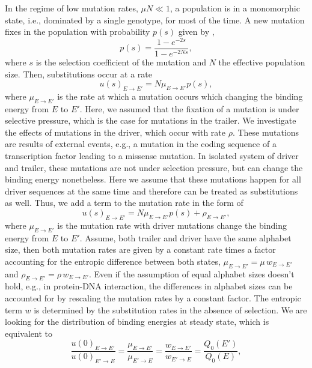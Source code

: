 \documentclass[10pt,a4paper]{article}
\begin{document}
\noindent In the regime of low mutation rates, $\mu N\ll1$, a population is in a monomorphic state, i.e., dominated by a single genotype, 
for most of the time. A new mutation fixes in the population with probability $p(s)$ given by \cite{kimura_probability_1962},
\begin{equation}
p(s) = \frac{1-e^{-2s}}{1-e^{-2Ns}},
\end{equation}
where $s$ is the selection coefficient of the mutation and $N$ the effective population size. Then, substitutions occur at a rate
\begin{equation}
u(s)_{E\rightarrow E'} = N\mu_{E\rightarrow E'}p(s),
\end{equation}
where $\mu_{E\rightarrow E'}$ is the rate at which a mutation occurs which changing the binding energy from $E$ to $E'$. Here, we assumed that the fixation 
of a mutation is under selective pressure, which is the case for mutations in the trailer. We investigate the effects of mutations in the driver, which occur 
with rate $\rho$. These mutations are results of external events, e.g., a mutation in the coding sequence of a transcription factor leading to a missense mutation. 
In isolated system of driver and trailer, these mutations are not under selection pressure, but can change the binding energy nonetheless. 
Here we assume that these mutations happen for all driver sequences at the same time and therefore can be treated as substitutions as well. 
Thus, we add a term to the mutation rate in the form of
\begin{equation}
u(s)_{E\rightarrow E'}=   N\mu_{E\rightarrow E'}p(s) + \rho_{E\rightarrow E'},
\end{equation}
where $\mu_{E\rightarrow E'}$ is the mutation rate with driver mutations change the binding energy from $E$ to $E'$.
Assume, both trailer and driver have the same alphabet size, then both mutation rates are given by a constant rate times a factor accounting for 
the entropic difference between both states, $\mu_{E\rightarrow E'}=\mu\,w_{E\rightarrow E'}$ and $\rho_{E\rightarrow E'}=\rho\,w_{E\rightarrow E'}$. 
Even if the assumption of equal alphabet sizes doesn't hold, e.g., in protein-DNA interaction, the differences in alphabet sizes can be accounted for 
by rescaling the mutation rates by a constant factor. The entropic term $w$ is determined by the substitution rates in the absence of selection.
We are looking for the distribution of binding energies at steady state, which is equivalent to 
\begin{equation}
\frac{u(0)_{E\rightarrow E'}}{u(0)_{E'\rightarrow E}} = \frac{\mu_{E\rightarrow E'}}{\mu_{E'\rightarrow E}}= \frac{w_{E\rightarrow E'}}{w_{E'\rightarrow E}} = 
\frac{Q_0(E')}{Q_0(E)},
\end{equation}
\end{document}
